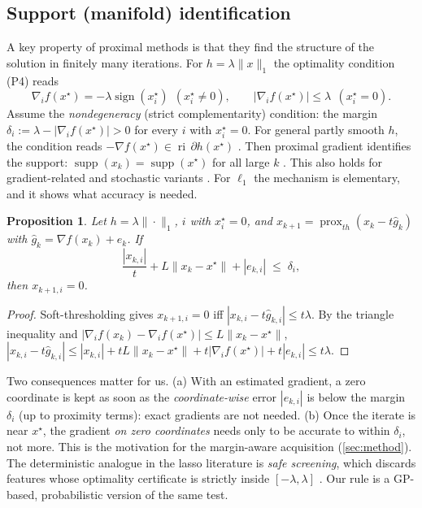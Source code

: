 \documentclass[10pt]{article}
\newcommand{\prox}{\operatorname{prox}}
\newcommand{\ri}{\operatorname{ri}}
\newcommand{\supp}{\operatorname{supp}}
\newtheorem{proposition}{Proposition}
\theoremstyle{remark}
\begin{document}
\subsection{Support (manifold) identification}\label{sec:ident}
A key property of proximal methods is that they find the structure of the solution in finitely many iterations. For $h=\lambda\|x\|_1$
the optimality condition (P4) reads
\[
\nabla_i f(x^\star)=-\lambda\operatorname{sign}(x_i^\star)\ \ (x_i^\star\neq0),\qquad |\nabla_i f(x^\star)|\le\lambda\ \ (x_i^\star=0).
\]
Assume the \emph{nondegeneracy} (strict complementarity) condition: the margin $\delta_i:=\lambda-|\nabla_if(x^\star)|>0$ for every $i$ with $x_i^\star=0$.
For general partly smooth $h$, the condition reads $-\nabla f(x^\star)\in\ri\,\partial h(x^\star)$ \citep{lewis2002partly,hare2004identify}.
Then proximal gradient identifies the support: $\supp(x_k)=\supp(x^\star)$ for all large $k$
\citep{hare2004identify,liang2017activity,nutini2019activeset}. This also holds for gradient-related and stochastic variants
\citep{sun2019manifold,poon2018identify}. For $\ell_1$ the mechanism is elementary, and it shows what accuracy is needed.

\begin{proposition}\label{prop:ident}
Let $h=\lambda\|\cdot\|_1$, $i$ with $x_i^\star=0$, and $x_{k+1}=\prox_{th}(x_k-t\hat g_k)$ with $\hat g_k=\nabla f(x_k)+e_k$. If
\[
\frac{|x_{k,i}|}{t}+L\|x_k-x^\star\|+|e_{k,i}|\;\le\;\delta_i,
\]
then $x_{k+1,i}=0$.
\end{proposition}
\begin{proof}
Soft-thresholding gives $x_{k+1,i}=0$ iff $|x_{k,i}-t\hat g_{k,i}|\le t\lambda$. By the triangle inequality and $|\nabla_if(x_k)-\nabla_if(x^\star)|\le L\|x_k-x^\star\|$,
$|x_{k,i}-t\hat g_{k,i}|\le|x_{k,i}|+tL\|x_k-x^\star\|+t|\nabla_i f(x^\star)|+t|e_{k,i}|\le t\lambda$.
\end{proof}

Two consequences matter for us. (a) With an estimated gradient, a zero coordinate is kept as soon as the \emph{coordinate-wise} error $|e_{k,i}|$
is below the margin $\delta_i$ (up to proximity terms): exact gradients are not needed. (b) Once the iterate is near $x^\star$, the gradient
\emph{on zero coordinates} needs only to be accurate to within $\delta_i$, not more. This is the motivation for the margin-aware acquisition
(\cref{sec:method}). The deterministic analogue in the lasso literature is \emph{safe screening}, which discards features whose
optimality certificate is strictly inside $[-\lambda,\lambda]$ \citep{elghaoui2012safe,fercoq2015gap,ndiaye2017gap}. Our rule is a
GP-based, probabilistic version of the same test.
\end{document}
